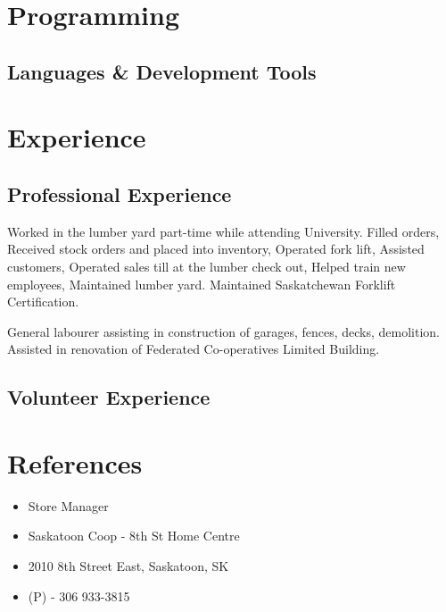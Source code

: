 \documentclass[11pt,letterpaper,sans]{moderncv}        %
\begin{document}
\section{Programming}
\subsection{Languages \& Development Tools}


\section{Experience}
\subsection{Professional Experience}
{
  Worked in the lumber yard part-time while attending University.
  \newline{}
  Filled orders, Received stock orders and placed into inventory, Operated fork lift, Assisted customers, Operated sales till at the lumber check out, Helped train new employees, Maintained  lumber yard. Maintained Saskatchewan Forklift Certification.
}

{
  General labourer assisting in construction of garages, fences, decks, demolition. Assisted in renovation of Federated Co-operatives Limited Building.
}

\subsection{Volunteer Experience}



\section{References}
{
  \begin{itemize}
    \item Store Manager
    \item Saskatoon Coop - 8th St Home Centre
    \item 2010 8th Street East, Saskatoon, SK
    \item (P) - 306 933-3815
  \end{itemize}
}
\end{document}
